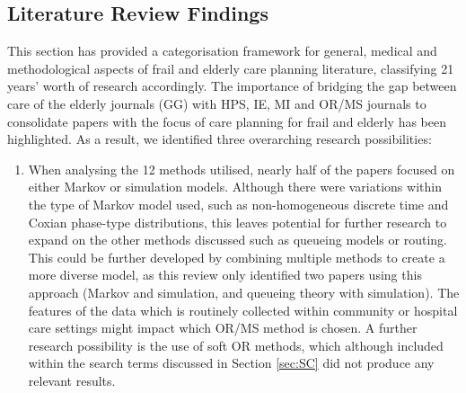 \documentclass[../thesis.tex]{subfiles}
\begin{document}
\subsection{Literature Review Findings}\label{sec:Conclusion}
This section has provided a categorisation framework for general, medical and methodological aspects of frail and elderly care planning literature, classifying 21 years' worth of research accordingly. The importance of bridging the gap between care of the elderly journals (GG) with HPS, IE, MI and OR/MS journals to consolidate papers with the focus of care planning for frail and elderly has been highlighted. As a result, we identified three overarching research possibilities:   

\begin{enumerate}%
    \item When analysing the 12 methods utilised, nearly half of the papers focused on either Markov or simulation models. Although there were variations within the type of Markov model used, such as non-homogeneous discrete time and Coxian phase-type distributions, this leaves potential for further research to expand on the other methods discussed such as queueing models or routing. This could be further developed by combining multiple methods to create a more diverse model, as this review only identified two papers using this approach (Markov and simulation, and queueing theory with simulation). The features of the data which is routinely collected within community or hospital care settings might impact which OR/MS method is chosen. A further research possibility is the use of soft OR methods, which although included within the search terms discussed in Section \ref{sec:SC} did not produce any relevant results.
    

\end{enumerate}
\end{document}
